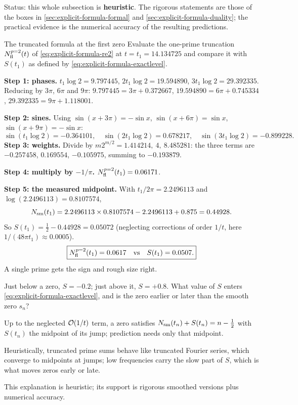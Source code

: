 Status: this whole subsection is \textbf{heuristic}. The rigorous statements are those of the boxes in \cref{sec:explicit-formula-formal} and \cref{sec:explicit-formula-duality}; the practical evidence is the numerical accuracy of the resulting predictions.

\begin{sample}{The truncated formula at the first zero}
Evaluate the one-prime truncation $N^{p=2}_{\rm fl}(t)$ of \cref{eq:explicit-formula-re2} at $t=t_1=14.134725$ and compare it with $S(t_1)$ as defined by \cref{eq:explicit-formula-exactlevel}.

\textbf{Step 1: phases.} $t_1\log2=9.797445$, $2t_1\log2=19.594890$, $3t_1\log2=29.392335$. Reducing by $3\pi$, $6\pi$ and $9\pi$: $9.797445=3\pi+0.372667$, $19.594890=6\pi+0.745334$, $29.392335=9\pi+1.118001$.

\textbf{Step 2: sines.} Using $\sin(x+3\pi)=-\sin x$, $\sin(x+6\pi)=\sin x$, $\sin(x+9\pi)=-\sin x$:
\[
\sin(t_1\log2)=-0.364101,\quad\sin(2t_1\log2)=0.678217,\quad\sin(3t_1\log2)=-0.899228.
\]
\textbf{Step 3: weights.} Divide by $m2^{m/2}=1.414214,\ 4,\ 8.485281$: the three terms are $-0.257458$, $0.169554$, $-0.105975$, summing to $-0.193879$.

\textbf{Step 4: multiply by $-1/\pi$.} $N^{p=2}_{\rm fl}(t_1)=0.06171$.

\textbf{Step 5: the measured midpoint.} With $t_1/2\pi=2.2496113$ and $\log(2.2496113)=0.8107574$,
\[
N_{\mathrm{sm}}(t_1)=2.2496113\times0.8107574-2.2496113+0.875=0.44928 .
\]
So $S(t_1)=\tfrac12-0.44928=0.05072$ (neglecting corrections of order $1/t$, here $1/(48\pi t_1)\approx0.0005$).
\[
\boxed{N^{p=2}_{\rm fl}(t_1)=0.0617\quad\text{vs}\quad S(t_1)=0.0507.}
\]
A single prime gets the sign and rough size right.
\end{sample}

\begin{checkpoint}
Just below a zero, $S=-0.2$; just above it, $S=+0.8$. What value of $S$ enters \cref{eq:explicit-formula-exactlevel}, and is the zero earlier or later than the smooth zero $s_n$?
\end{checkpoint}

\begin{keyideas}
\item Up to the neglected $\mathcal{O}(1/t)$ term, a zero satisfies $N_{\mathrm{sm}}(t_n)+S(t_n)=n-\tfrac12$ with $S(t_n)$ the midpoint of its jump; prediction needs only that midpoint.
\item Heuristically, truncated prime sums behave like truncated Fourier series, which converge to midpoints at jumps; low frequencies carry the slow part of $S$, which is what moves zeros early or late.
\item This explanation is heuristic; its support is rigorous smoothed versions plus numerical accuracy.
\end{keyideas}

